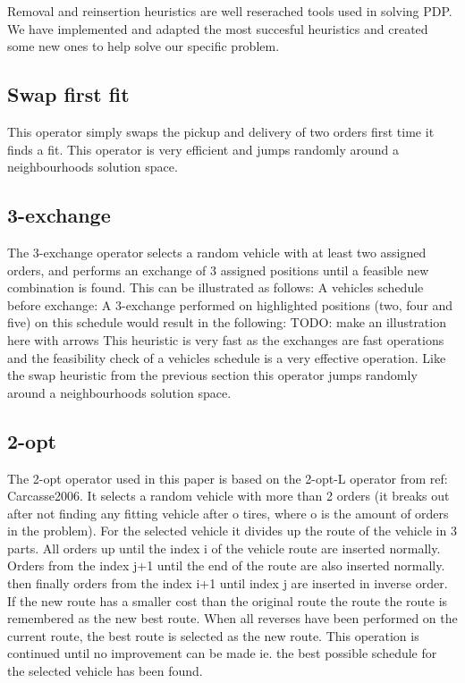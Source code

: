 \documentclass[../main.tex]{subfiles}
\begin{document}
Removal and reinsertion heuristics are well reserached tools used in solving PDP. 
We have implemented and adapted the most succesful heuristics and created some new ones to help solve our specific problem. 

\subsection{Swap first fit}
\label{sec:swap}
This operator simply swaps the pickup and delivery of two orders first time it finds a fit.
This operator is very efficient and jumps randomly around a neighbourhoods solution space.

\subsection{3-exchange}
\label{sec:exch}
The 3-exchange operator selects a random vehicle with at least two assigned orders, and performs an exchange of 3 assigned positions until a feasible new combination is found. This can be illustrated as follows: \newline
A vehicles schedule before exchange:  \newline
A 3-exchange performed on highlighted positions (two, four and five) on this schedule would result in the following:   TODO: make an illustration here with arrows \newline
This heuristic is very fast as the exchanges are fast operations and the feasibility check of a vehicles schedule is a very effective operation. Like the swap heuristic from the previous section this operator jumps randomly around a neighbourhoods solution space.

\subsection{2-opt}
\label{sec:2opt}
The 2-opt operator used in this paper is based on the 2-opt-L operator from {ref: Carcasse2006}. 
It selects a random vehicle with more than 2 orders (it breaks out after not finding any fitting vehicle after o tires, where o is the amount of orders in the problem).
For the selected vehicle it divides up the route of the vehicle in 3 parts. 
All orders up until the index i of the vehicle route are inserted normally. 
Orders from the index j+1 until the end of the route are also inserted normally. 
then finally orders from the index i+1 until index j are inserted in inverse order.
If the new route has a smaller cost than the original route the route the route is remembered as the new best route. 
When all reverses have been performed on the current route, the best route is selected as the new route.
This operation is continued until no improvement can be made ie. the best possible schedule for the selected vehicle has been found.
\end{document}
